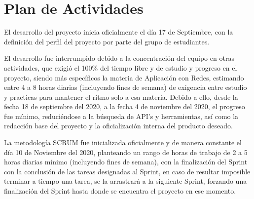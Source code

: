 \chapter{Plan de Actividades}

El desarrollo del proyecto inicia oficialmente el día 17 de Septiembre, con la definición del perfil del proyecto por parte del grupo de estudiantes.

El desarrollo fue interrumpido debido a la concentración del equipo en otras actividades, que exigió el 100\% del tiempo libre y de estudio y progreso en el proyecto, siendo más específicos la materia de Aplicación con Redes, estimando entre 4 a 8 horas diarias (incluyendo fines de semana) de exigencia entre estudio y practicas para mantener el ritmo solo a esa materia. Debido a ello, desde la fecha 18 de septiembre del 2020, a la fecha 4 de noviembre del 2020, el progreso fue mínimo, reduciéndose a la búsqueda de API's y herramientas, así como la redacción base del proyecto y la oficialización interna del producto deseado.

La metodología SCRUM fue inicializada oficialmente y de manera constante el día 10 de Noviembre del 2020, planteando un rango de horas de trabajo de 2 a 5 horas diarias mínimo (incluyendo fines de semana), con la finalización del Sprint con la conclusión de las tareas designadas al Sprint, en caso de resultar imposible terminar a tiempo una tarea, se la arrastrará a la siguiente Sprint, forzando una finalización del Sprint hasta donde se encuentra el proyecto en ese momento.


